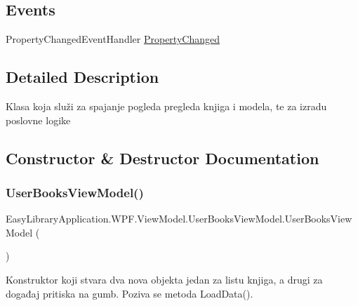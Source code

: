 \subsection*{Events}
\begin{DoxyCompactItemize}
\item 
Property\+Changed\+Event\+Handler \mbox{\hyperlink{class_easy_library_application_1_1_w_p_f_1_1_view_model_1_1_user_books_view_model_a2073c3f2b1b2cd6137f46eb1494037be}{Property\+Changed}}
\end{DoxyCompactItemize}


\subsection{Detailed Description}
Klasa koja služi za spajanje pogleda pregleda knjiga i modela, te za izradu poslovne logike 



\subsection{Constructor \& Destructor Documentation}
\mbox{\label{class_easy_library_application_1_1_w_p_f_1_1_view_model_1_1_user_books_view_model_ae2fc49b6721388e02a491684c5f16fd0}} 
\subsubsection{\texorpdfstring{User\+Books\+View\+Model()}{UserBooksViewModel()}}
{\footnotesize\ttfamily Easy\+Library\+Application.\+W\+P\+F.\+View\+Model.\+User\+Books\+View\+Model.\+User\+Books\+View\+Model (\begin{DoxyParamCaption}{ }\end{DoxyParamCaption})}



Konstruktor koji stvara dva nova objekta jedan za listu knjiga, a drugi za događaj pritiska na gumb. Poziva se metoda Load\+Data(). 



